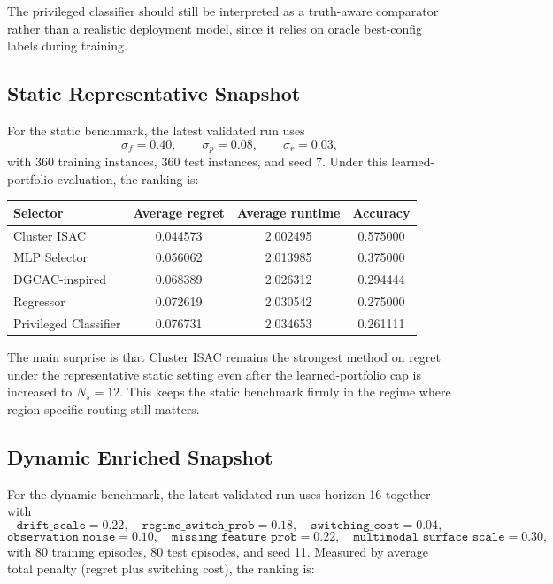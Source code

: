 \documentclass[11pt]{report}
\begin{document}
The privileged classifier should still be interpreted as a truth-aware comparator rather than a realistic deployment model, since it relies on oracle best-config labels during training.

\subsection{Static Representative Snapshot}

For the static benchmark, the latest validated run uses
\[
\sigma_f = 0.40,\qquad \sigma_p = 0.08,\qquad \sigma_r = 0.03,
\]
with 360 training instances, 360 test instances, and seed 7. Under this learned-portfolio evaluation, the ranking is:

\begin{center}
\begin{tabular}{lccc}
\toprule
Selector & Average regret & Average runtime & Accuracy \\
\midrule
Cluster ISAC & 0.044573 & 2.002495 & 0.575000 \\
MLP Selector & 0.056062 & 2.013985 & 0.375000 \\
DGCAC-inspired & 0.068389 & 2.026312 & 0.294444 \\
Regressor & 0.072619 & 2.030542 & 0.275000 \\
Privileged Classifier & 0.076731 & 2.034653 & 0.261111 \\
\bottomrule
\end{tabular}
\end{center}

The main surprise is that Cluster ISAC remains the strongest method on regret under the representative static setting even after the learned-portfolio cap is increased to $N_s = 12$. This keeps the static benchmark firmly in the regime where region-specific routing still matters.

\subsection{Dynamic Enriched Snapshot}

For the dynamic benchmark, the latest validated run uses horizon 16 together with
\[
\texttt{drift\_scale}=0.22,\quad
\texttt{regime\_switch\_prob}=0.18,\quad
\texttt{switching\_cost}=0.04,
\]
\[
\texttt{observation\_noise}=0.10,\quad
\texttt{missing\_feature\_prob}=0.22,\quad
\texttt{multimodal\_surface\_scale}=0.30,
\]
with 80 training episodes, 80 test episodes, and seed 11. Measured by average total penalty (regret plus switching cost), the ranking is:
\end{document}
